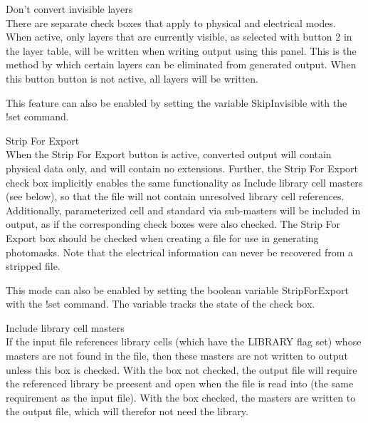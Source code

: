 \begin{description}
\item{\cb Don't convert invisible layers}\\
There are separate check boxes that apply to physical and electrical
modes.  When active, only layers that are currently visible, as
selected with button 2 in the layer table, will be written when
writing output using this panel.  This is the method by which certain
layers can be eliminated from generated output.  When this button
button is not active, all {\Xic} layers will be written.

This feature can also be enabled by setting the variable {\et
SkipInvisible} with the {\cb !set} command.

\item{\cb Strip For Export}\\
When the {\cb Strip For Export} button is active, converted output
will contain physical data only, and will contain no {\Xic}
extensions.  Further, the {\cb Strip For Export} check box implicitly
enables the same functionality as {\cb Include library cell masters} (see
below), so that the file will not contain unresolved library cell
references.  Additionally, parameterized cell and standard via
sub-masters will be included in output, as if the corresponding check
boxes were also checked.  The {\cb Strip For Export} box should be
checked when creating a file for use in generating photomasks.  Note
that the electrical information can never be recovered from a stripped
file.

This mode can also be enabled by setting the boolean variable {\et
StripForExport} with the {\cb !set} command.  The variable tracks the
state of the check box.

\item{\cb Include library cell masters}\\
If the input file references library cells (which have the LIBRARY
flag set) whose masters are not found in the file, then these masters
are not written to output unless this box is checked.  With the box
not checked, the output file will require the referenced library be
preesent and open when the file is read into {\Xic} (the same
requirement as the input file).  With the box checked, the masters are
written to the output file, which will therefor not need the library.


\end{description}
